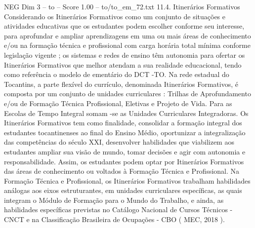 \begin{textsample}{NEG Dim 3 – to – Score 1.00 – to/to\_em\_72.txt}  \label{ex:f3_neg_189}
11.4.
Itinerários Formativos Considerando os Itinerários Formativos como um conjunto de situações e atividades educativas que os estudantes podem escolher conforme seu interesse, para aprofundar e ampliar aprendizagens em uma ou mais áreas de conhecimento e/ou na formação técnica e profissional com carga horária total mínima conforme legislação vigente ; os sistemas e redes de ensino têm autonomia para ofertar os Itinerários Formativos que melhor atendam a sua realidade educacional, tendo como referência o modelo de ementário do DCT -TO.
Na rede estadual do Tocantins, a parte flexível do currículo, denominada Itinerários Formativos, é composta por um conjunto de unidades curriculares : Trilhas de Aprofundamento e/ou de Formação Técnica Profissional, Eletivas e Projeto de Vida.
Para as Escolas de Tempo Integral somam -se as Unidades Curriculares Integradoras.
Os Itinerários Formativos tem como finalidade, consolidar a formação integral dos estudantes tocantinenses ao final do Ensino Médio, oportunizar a integralização das competências do século XXI, desenvolver habilidades que viabilizem aos estudantes ampliar sua visão de mundo, tomar decisões e agir com autonomia e responsabilidade.
Assim, os estudantes podem optar por Itinerários Formativos das áreas de conhecimento ou voltados à Formação Técnica e Profissional.
Na Formação Técnica e Profissional, os Itinerários Formativos trabalham habilidades análogas aos eixos estruturantes, em unidades curriculares específicas, as quais integram o Módulo de Formação para o Mundo do Trabalho, e ainda, as habilidades específicas previstas no Catálogo Nacional de Cursos Técnicos - CNCT e na Classificação Brasileira de Ocupações - CBO ( MEC, 2018 ).

\end{textsample}

